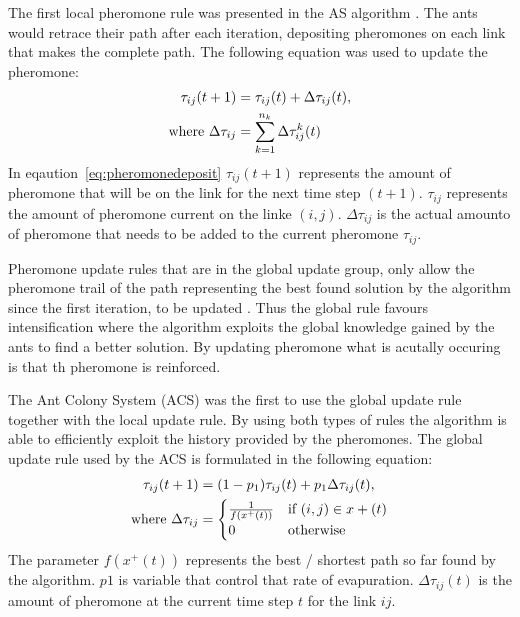 The first local pheromone rule was presented in the AS algorithm \cite{CompuIntelligenceIntro,AntSurvey,AntsAndStigmergy}. The ants would retrace their path after each iteration, depositing pheromones on each link that makes the complete path. The following equation was used to update the pheromone:
\begin{align}
\label{eq:pheromonedeposit}
 \tau_{ij}(t+1) &= \tau_{ij}(t) + \Delta\tau_{ij}(t),\\ 
 \text{where }\Delta\tau_{ij} &= \sum^{n_k}_{k=1}\Delta\tau^k_{ij}(t) \notag
\end{align}
In eqaution~\ref{eq:pheromonedeposit} $\tau_{ij}(t+1)$ represents the amount of pheromone that will be on the link for the next time step $(t+1)$. $\tau_{ij}$ represents the amount of pheromone current on the linke $(i,j)$. $\Delta\tau_{ij}$ is the actual amounto of pheromone that needs to be added to the current pheromone $\tau_{ij}$.

Pheromone update rules that are in the global update group, only allow the pheromone trail of the path representing the best found solution by the algorithm since the first iteration, to be updated \cite{CompuIntelligenceIntro}. Thus the global rule favours intensification where the algorithm exploits the global knowledge gained by the ants to find a better solution. By updating pheromone what is acutally occuring is that th pheromone is reinforced.

The Ant Colony System (ACS) was the first to use the global update rule together with the local update rule\cite{CompuIntelligenceIntro}. By using both types of rules the algorithm is able to efficiently exploit the history provided by the pheromones\cite{CompuIntelligenceIntro}. The global update rule used by the ACS is formulated in the following equation\cite{CompuIntelligenceIntro}:
\begin{align}
\label{eq:pheromoneupdate}
	\tau_{ij}(t + 1) &= (1 - p_1)\tau_{ij}(t) + p_1\Delta\tau_{ij}(t),\\
	\text{where }\Delta\tau_{ij} &= \notag
	\begin{cases}
		\frac{1}{f(x^+(t))} &\text{if $(i,j) \in x+(t)$}\\
		0 &\text{otherwise}
	\end{cases}
\end{align}
The parameter $f(x^+(t))$ represents the best / shortest path so far found by the algorithm\cite{CompuIntelligenceIntro}. $p1$ is variable that control that rate of evapuration. $\Delta\tau_{ij}(t)$ is the amount of pheromone at the current time step $t$ for the link $ij$.

